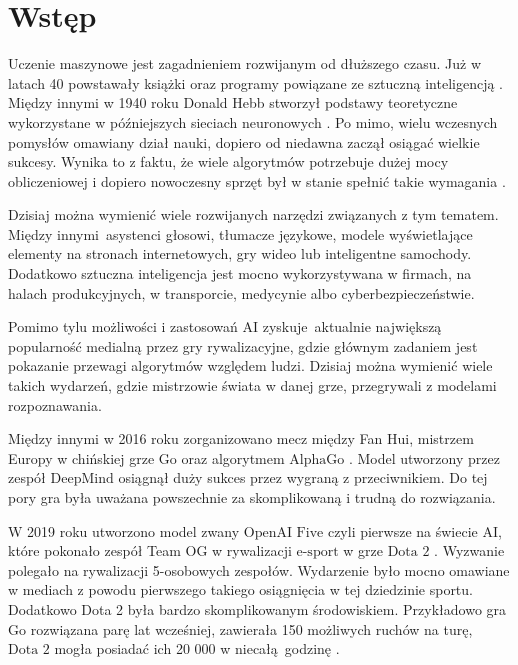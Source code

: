 \documentclass[12pt,oneside,a4paper]{report}
\begin{document}

\tableofcontents{}
\newpage

\setlength{\parindent}{0.5em}
\setlength{\parskip}{0.5em}
\renewcommand{\baselinestretch}{1.5}



\chapter{Wstęp}

Uczenie maszynowe jest zagadnieniem rozwijanym od dłuższego czasu.
Już w latach 40 powstawały książki oraz programy powiązane ze sztuczną inteligencją \cite{hist AI}. 
Między innymi w 1940 roku Donald Hebb stworzył podstawy teoretyczne wykorzystane w 
późniejszych sieciach neuronowych \cite{hist AI}. Po mimo, wielu wczesnych pomysłów omawiany dział
nauki,
dopiero od niedawna zaczął osiągać wielkie sukcesy. Wynika to z faktu, że wiele algorytmów
potrzebuje
dużej mocy obliczeniowej  
i dopiero nowoczesny sprzęt był w stanie spełnić takie wymagania \cite{hist AI}.

Dzisiaj można wymienić wiele rozwijanych narzędzi związanych z tym tematem.
Między innymi asystenci głosowi, tłumacze językowe, modele wyświetlające elementy na
stronach internetowych, gry wideo lub inteligentne samochody.
Dodatkowo sztuczna inteligencja jest mocno wykorzystywana w firmach,
na halach produkcyjnych, w transporcie, medycynie albo cyberbezpieczeństwie. 


Pomimo tylu możliwości i zastosowań AI zyskuje aktualnie największą 
popularność
medialną przez gry rywalizacyjne, gdzie głównym zadaniem jest pokazanie przewagi 
algorytmów względem
ludzi. Dzisiaj można wymienić wiele takich wydarzeń, gdzie 
mistrzowie świata w danej grze, przegrywali z modelami rozpoznawania. 


Między innymi w 2016 roku zorganizowano
mecz między Fan Hui, mistrzem Europy w chińskiej grze $\text{Go}$ oraz algorytmem
$\text{AlphaGo}$ \cite{Go}.
Model utworzony przez zespół $\text{DeepMind}$ osiągnął duży sukces przez wygraną z przeciwnikiem.
Do tej pory gra była uważana powszechnie za skomplikowaną i trudną do rozwiązania.

W 2019 roku utworzono model zwany $\text{OpenAI Five}$ czyli pierwsze na świecie AI, które pokonało
zespół Team OG w rywalizacji $\text{e-sport}$ w grze $\text{Dota 2}$ \cite{Dota2}. Wyzwanie polegało
na rywalizacji 5-osobowych
zespołów.
Wydarzenie było mocno omawiane w mediach z powodu pierwszego takiego osiągnięcia w tej dziedzinie
sportu. 
Dodatkowo Dota 2 była bardzo skomplikowanym środowiskiem.
Przykładowo gra $\text{Go}$ rozwiązana parę lat wcześniej, zawierała 150 możliwych ruchów na turę, 
$\text{Dota 2}$
mogła posiadać ich 20 000 w niecałą godzinę \cite{Dota2}.
\end{document}
